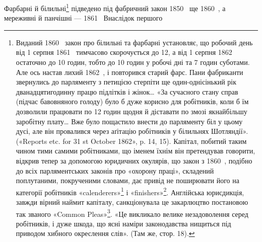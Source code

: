 Фарбарні й білильні\footnote{
Виданий 1860~ закон про білильні та фарбарні установляє,
що робочий день від 1 серпня 1861~ тимчасово скорочується до 12, а
від 1 серпня 1862~ остаточно до 10 годин, тобто до 10 годин у робочі
дні та 7 годин суботами. Але ось настав лихий 1862~, і повторився
старий фарс. Пани фабриканти звернулись до парляменту з петицією
стерпіти ще один-однісінький рік дванадцятигодинну працю підлітків
і жінок\dots{} «За сучасного стану справ (підчас бавовняного голоду) було б
дуже корисно для робітників, коли б їм дозволили працювати по 12 годин
щодня й діставати по змозі якнайбільшу заробітну плату\dots{} Вже було
пощастило внести до парляменту біл у цьому дусі, але він провалився
через аґітацію робітників у білильнях Шотляндії». («Reports etc. for
31 st October 1862», p. 14, 15). Капітал, побитий таким чином тими самими
робітниками, що іменем їхнім він претендував говорити, відкрив тепер
за допомогою юридичних окулярів, що закон з 1860~, подібно до всіх
парляментських законів про «охорону праці», складений поплутаними,
покрученими словами, дає привід не поширювати його на категорії робітників
«calenderers»\footnote*{— пресувальники сукна. \emph{Ред.}
} і «finishers»\footnote*{
— апретери. \emph{Ред.}
}. Англійська юрисдикція, завжди
вірний наймит капіталу, санкціонувала це закарлюцтво постановою так
званого «Common Pleas»\footnote*{— цивільний суд. \emph{Ред.}
}. «Це викликало велике незадоволення серед
робітників, і дуже шкода, що ясні наміри законодавства нищиться під
приводом хибного окреслення слів». (Там же, стор. 18).
} підведено під фабричний закон 1850~
ще 1860~, а мереживні й панчішні — 1861~ Внаслідок першого
\parbreak{}  %
